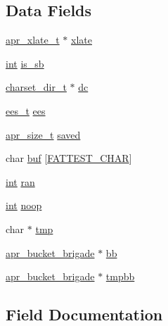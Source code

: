 \subsection*{Data Fields}
\begin{DoxyCompactItemize}
\item 
\hyperlink{group__APR__XLATE_ga069dabbadc30e3a4157c38104a250e77}{apr\+\_\+xlate\+\_\+t} $\ast$ \hyperlink{structcharset__filter__ctx__t_a46d8ca19c551d1739620eb5c51d0ddbc}{xlate}
\item 
\hyperlink{pcre_8txt_a42dfa4ff673c82d8efe7144098fbc198}{int} \hyperlink{structcharset__filter__ctx__t_ada4f5de1452245217fd91725e91e8806}{is\+\_\+sb}
\item 
\hyperlink{structcharset__dir__t}{charset\+\_\+dir\+\_\+t} $\ast$ \hyperlink{structcharset__filter__ctx__t_a36733d39c38542582a207a229bcd4bf0}{dc}
\item 
\hyperlink{mod__charset__lite_8c_a2886bd6422fe49d0c53e252fe4a1edd7}{ees\+\_\+t} \hyperlink{structcharset__filter__ctx__t_a1cf1037753bee17898ecc02253eee36e}{ees}
\item 
\hyperlink{group__apr__platform_gaaa72b2253f6f3032cefea5712a27540e}{apr\+\_\+size\+\_\+t} \hyperlink{structcharset__filter__ctx__t_aa7290f5f1e2c90aaf6f9cdb13a55a94a}{saved}
\item 
char \hyperlink{structcharset__filter__ctx__t_a9a41a1c6be10983b5c03c31f7d70b063}{buf} \mbox{[}\hyperlink{mod__charset__lite_8c_a61a9f781c44f32070ce655a6609d5b26}{F\+A\+T\+T\+E\+S\+T\+\_\+\+C\+H\+AR}\mbox{]}
\item 
\hyperlink{pcre_8txt_a42dfa4ff673c82d8efe7144098fbc198}{int} \hyperlink{structcharset__filter__ctx__t_a57390e6d26a6133664420e765f8f28e4}{ran}
\item 
\hyperlink{pcre_8txt_a42dfa4ff673c82d8efe7144098fbc198}{int} \hyperlink{structcharset__filter__ctx__t_a5fd92326a7c24db754885b0fb2904867}{noop}
\item 
char $\ast$ \hyperlink{structcharset__filter__ctx__t_ae93f9255c297e06e7d8d736a72eeeff3}{tmp}
\item 
\hyperlink{structapr__bucket__brigade}{apr\+\_\+bucket\+\_\+brigade} $\ast$ \hyperlink{structcharset__filter__ctx__t_a171dec35ca595ceff47e00e4d6564960}{bb}
\item 
\hyperlink{structapr__bucket__brigade}{apr\+\_\+bucket\+\_\+brigade} $\ast$ \hyperlink{structcharset__filter__ctx__t_ab7a81885b0b4b889a4e592a10cf13f99}{tmpbb}
\end{DoxyCompactItemize}


\subsection{Field Documentation}
